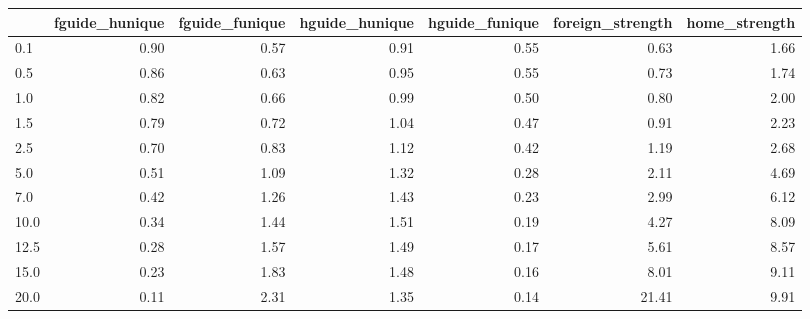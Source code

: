 \begin{tabular}{lrrrrrr}
\toprule
 & fguide_hunique & fguide_funique & hguide_hunique & hguide_funique & foreign_strength & home_strength \\
\midrule
0.1 & 0.90 & 0.57 & 0.91 & 0.55 & 0.63 & 1.66 \\
0.5 & 0.86 & 0.63 & 0.95 & 0.55 & 0.73 & 1.74 \\
1.0 & 0.82 & 0.66 & 0.99 & 0.50 & 0.80 & 2.00 \\
1.5 & 0.79 & 0.72 & 1.04 & 0.47 & 0.91 & 2.23 \\
2.5 & 0.70 & 0.83 & 1.12 & 0.42 & 1.19 & 2.68 \\
5.0 & 0.51 & 1.09 & 1.32 & 0.28 & 2.11 & 4.69 \\
7.0 & 0.42 & 1.26 & 1.43 & 0.23 & 2.99 & 6.12 \\
10.0 & 0.34 & 1.44 & 1.51 & 0.19 & 4.27 & 8.09 \\
12.5 & 0.28 & 1.57 & 1.49 & 0.17 & 5.61 & 8.57 \\
15.0 & 0.23 & 1.83 & 1.48 & 0.16 & 8.01 & 9.11 \\
20.0 & 0.11 & 2.31 & 1.35 & 0.14 & 21.41 & 9.91 \\
\bottomrule
\end{tabular}
